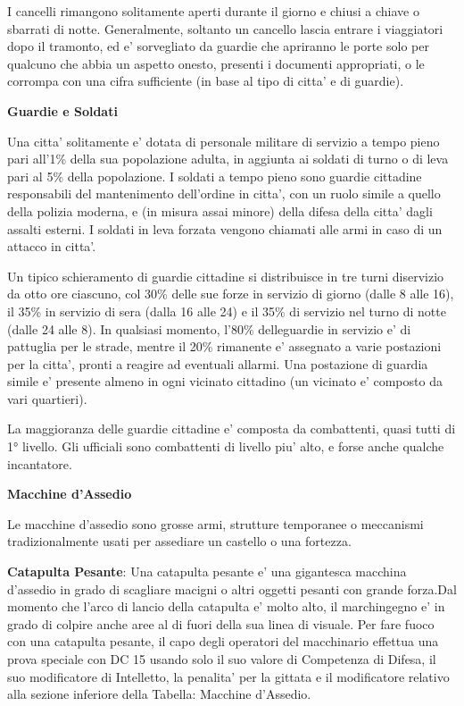 \documentclass[a4paper,11pt,twoside,openany]{book}
\begin{document}
{		I cancelli rimangono solitamente aperti durante il giorno e chiusi a chiave o sbarrati di notte. Generalmente, soltanto un cancello lascia entrare i viaggiatori dopo il tramonto, ed e' sorvegliato da guardie che apriranno le porte solo per qualcuno che abbia un aspetto onesto, presenti i documenti appropriati, o le corrompa con una cifra sufficiente (in base al tipo di citta' e di guardie).
		
		\textbf{Guardie e Soldati}
		
		Una citta' solitamente e' dotata di personale militare di servizio a tempo pieno pari all'1\% della sua popolazione adulta, in aggiunta ai soldati di turno o di leva pari al 5\% della popolazione. I soldati a tempo pieno sono guardie cittadine responsabili del mantenimento dell'ordine in citta', con un ruolo simile a quello della polizia moderna, e (in misura assai minore) della difesa della citta' dagli assalti esterni. I soldati in leva forzata vengono chiamati alle armi in caso di un attacco in citta'.
		
		Un tipico schieramento di guardie cittadine si distribuisce in tre turni diservizio da otto ore ciascuno, col 30\% delle sue forze in servizio di giorno (dalle 8 alle 16), il 35\% in servizio di sera (dalla 16 alle 24) e il 35\% di servizio nel turno di notte (dalle 24 alle 8). In qualsiasi momento, l'80\% delleguardie in servizio e' di pattuglia per le strade, mentre il 20\% rimanente e' assegnato a varie postazioni per la citta', pronti a reagire ad eventuali allarmi. Una postazione di guardia simile e' presente almeno in ogni vicinato cittadino (un vicinato e' composto da vari quartieri).
		
		La maggioranza delle guardie cittadine e' composta da combattenti, quasi tutti di 1° livello. Gli ufficiali sono combattenti di livello piu' alto, e forse anche qualche incantatore.
		
		\textbf{Macchine d'Assedio}
		
		Le macchine d'assedio sono grosse armi, strutture temporanee o meccanismi tradizionalmente usati per assediare un castello o una fortezza.
		
		\textbf{Catapulta Pesante}: Una catapulta pesante e' una gigantesca macchina d'assedio in grado di scagliare macigni o altri oggetti pesanti con grande forza.Dal momento che l'arco di lancio della catapulta e' molto alto, il marchingegno e' in grado di colpire anche aree al di fuori della sua linea di visuale. Per fare fuoco con una catapulta pesante, il capo degli operatori del macchinario effettua una prova speciale con DC 15 usando solo il suo valore di Competenza di Difesa, il suo modificatore di Intelletto, la penalita' per la gittata e il modificatore relativo alla sezione inferiore della Tabella: Macchine d'Assedio. 
		
}
\end{document}
